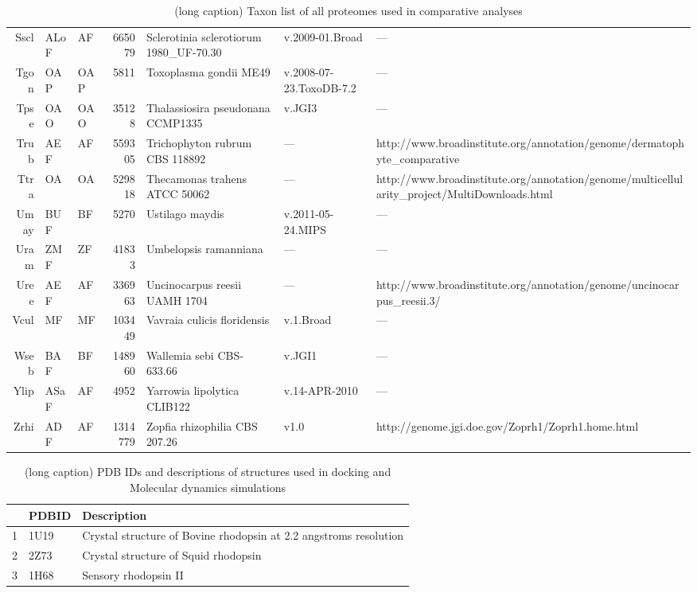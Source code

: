 \begin{table}[tbp]
\begin{tabular}{rllrlll}
  Sscl & ALoF & AF & 665079 & Sclerotinia sclerotiorum 1980\_UF-70.30 & v.2009-01.Broad & --- \\ 
  Tgon & OAP & OAP & 5811 & Toxoplasma gondii ME49 & v.2008-07-23.ToxoDB-7.2 & --- \\ 
  Tpse & OAO & OAO & 35128 & Thalassiosira pseudonana CCMP1335 & v.JGI3 & --- \\ 
  Trub & AEF & AF & 559305 & Trichophyton rubrum CBS 118892 & --- & http://www.broadinstitute.org/annotation/genome/dermatophyte\_comparative \\ 
  Ttra & OA & OA & 529818 & Thecamonas trahens ATCC 50062 & --- & http://www.broadinstitute.org/annotation/genome/multicellularity\_project/MultiDownloads.html \\ 
  Umay & BUF & BF & 5270 & Ustilago maydis & v.2011-05-24.MIPS & --- \\ 
  Uram & ZMF & ZF & 41833 & Umbelopsis ramanniana & --- & --- \\ 
  Uree & AEF & AF & 336963 & Uncinocarpus reesii UAMH 1704 & --- & http://www.broadinstitute.org/annotation/genome/uncinocarpus\_reesii.3/ \\ 
  Vcul & MF & MF & 103449 & Vavraia culicis floridensis & v.1.Broad & --- \\ 
  Wseb & BAF & BF & 148960 & Wallemia sebi CBS-633.66 & v.JGI1 & --- \\ 
  Ylip & ASaF & AF & 4952 & Yarrowia lipolytica CLIB122 & v.14-APR-2010 & --- \\ 
  Zrhi & ADF & AF & 1314779 & Zopfia rhizophilia CBS 207.26 & v1.0 & http://genome.jgi.doe.gov/Zoprh1/Zoprh1.home.html \\ 
   \hline
\hline
\end{tabular}
\caption[(short caption) Taxon list of all proteomes used in comparative analyses.]{(long caption) Taxon list of all proteomes used in comparative analyses} 
\label{tab:AppData_taxa}
\end{table}
\begin{table}[tbp]
\centering
\begin{tabular}{rll}
  \hline
\hline
 & PDBID & Description \\ 
  \hline
1 & 1U19 & Crystal structure of Bovine rhodopsin at 2.2 angstroms resolution \\ 
  2 & 2Z73 & Crystal structure of Squid rhodopsin \\ 
  3 & 1H68 & Sensory rhodopsin II \\ 
   \hline
\hline
\end{tabular}
\caption[(short caption) PDB IDs and descriptions of structures used in comparative analyses]{(long caption) PDB IDs and descriptions of structures used in docking and Molecular dynamics simulations} 
\label{tab:AppData_PDB}
\end{table}